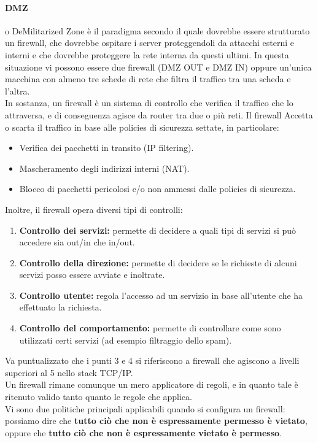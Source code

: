 \documentclass[a4paper]{report}
\begin{document}
\paragraph{DMZ} o DeMilitarized Zone è il paradigma secondo il quale dovrebbe essere strutturato un firewall, che dovrebbe ospitare i server proteggendoli da attacchi esterni e interni e che dovrebbe proteggere la rete interna da questi ultimi. In questa situazione vi possono essere due firewall (DMZ OUT e DMZ IN) oppure un'unica macchina con almeno tre schede di rete che filtra il traffico tra una scheda e l'altra.\\
In sostanza, un firewall è un sistema di controllo che verifica il traffico che lo attraversa, e di conseguenza agisce da router tra due o più reti. Il firewall Accetta o scarta il traffico in base alle policies di sicurezza settate, in particolare:
\begin{itemize}
\item Verifica dei pacchetti in transito (IP filtering).
\item Mascheramento degli indirizzi interni (NAT).
\item Blocco di pacchetti pericolosi e/o non ammessi dalle policies di sicurezza.
\end{itemize}
Inoltre, il firewall opera diversi tipi di controlli:
\begin{enumerate}
\item \textbf{Controllo dei servizi:} permette di decidere a quali tipi di
servizi si può accedere sia out/in che in/out.
\item \textbf{Controllo della direzione:} permette di decidere se le
richieste di alcuni servizi posso essere avviate e inoltrate.
\item \textbf{Controllo utente:} regola l'accesso ad un servizio in base
all'utente che ha effettuato la richiesta.
\item \textbf{Controllo del comportamento:} permette di controllare come
sono utilizzati certi servizi (ad esempio filtraggio dello spam).
\end{enumerate}
Va puntualizzato che i punti 3 e 4 si riferiscono a firewall che agiscono a livelli superiori al 5 nello stack TCP/IP.\\
Un firewall rimane comunque un mero applicatore di regoli, e in quanto tale è ritenuto valido tanto quanto le regole che applica.\\
Vi sono due politiche principali applicabili quando si configura un firewall: possiamo dire che \textbf{tutto ciò che non è espressamente permesso è vietato}, oppure che \textbf{tutto ciò che non è espressamente vietato è permesso}.\\
\end{document}
